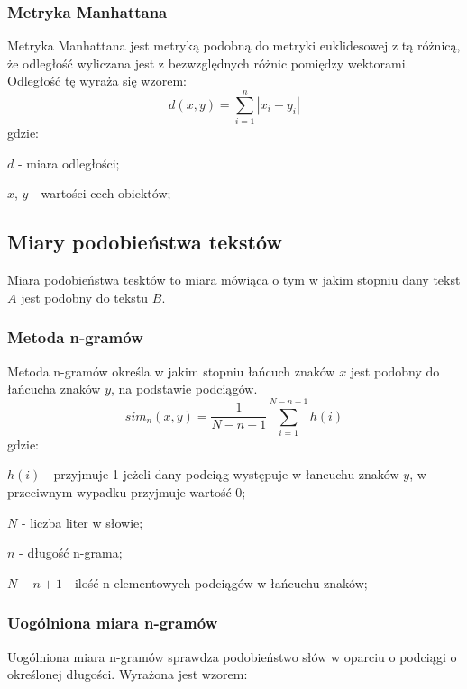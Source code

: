 \documentclass{classrep}
\begin{document}
\subsubsection{Metryka Manhattana}
Metryka Manhattana jest metryką podobną do metryki euklidesowej z tą różnicą, że odległość wyliczana jest
z bezwzględnych różnic pomiędzy wektorami. Odległość tę wyraża się wzorem:
\begin{equation}
    d(x,y)=\sum_{i=1}^{n} |x_{i}-y_{i}|
\end{equation}
gdzie:\\
\begin{description}
    \item $d$ - miara odległości;
    \item $x$, $y$ - wartości cech obiektów;
\end{description}

\subsection{Miary podobieństwa tekstów}
Miara podobieństwa tesktów to miara mówiąca o tym w jakim stopniu dany tekst $A$ jest podobny do tekstu $B$.

\subsubsection{Metoda n-gramów}
Metoda n-gramów określa w jakim stopniu łańcuch znaków $x$ jest podobny do łańcucha znaków $y$, na podstawie podciągów.
\begin{equation}
    sim_{n}(x,y)=\frac{1}{N-n+1}\sum_{i=1}^{N-n+1}h(i)
\end{equation}
gdzie:\\
\begin{description}
    \item $h(i)$ - przyjmuje 1 jeżeli dany podciąg występuje w łancuchu znaków $y$, w przeciwnym wypadku przyjmuje wartość 0;
    \item $N$ - liczba liter w słowie;
    \item $n$ - długość n-grama;
    \item $N-n+1$ - ilość n-elementowych podciągów w łańcuchu znaków;
\end{description}

\subsubsection{Uogólniona miara n-gramów}
Uogólniona miara n-gramów sprawdza podobieństwo słów w oparciu o podciągi o określonej długości. Wyrażona jest wzorem:
\end{document}
